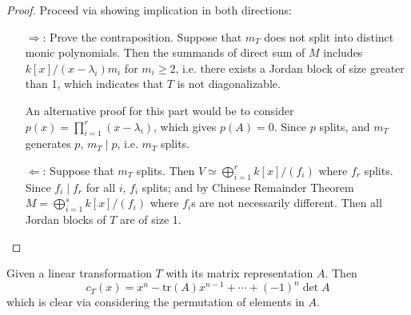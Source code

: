 \begin{proof}
    Proceed via showing implication in both directions:
    \begin{itemize}
        \item[$\Rightarrow$:] Prove the contraposition. Suppose that $m_T$ does not split into distinct monic polynomials. Then the summands of direct sum of $M$ includes $k[x]/(x - \lambda_i) m_i$ for $m_i \geq 2$, i.e. there exists a Jordan block of size greater than 1, which indicates that $T$ is not diagonalizable.

        An alternative proof for this part would be to consider $p(x) = \prod_{i=1}^r (x - \lambda_i)$, which gives $p(A) = 0$. Since $p$ splits, and $m_T$ generates $p$, $m_T\mid p$, i.e. $m_T$ splits.
        \item[$\Leftarrow$:] Suppose that $m_T$ splits. Then $V \simeq \bigoplus_{i=1}^r k[x]/(f_i)$ where $f_r$ splits. Since $f_i \mid f_r$ for all $i$, $f_i$ splits; and by Chinese Remainder Theorem $M = \bigoplus_{i=1}^s k[x]/(f_i)$ where $f_i$s are not necessarily different. Then all Jordan blocks of $T$ are of size 1.
    \end{itemize}
\end{proof}

\begin{remark}
    Given a linear transformation $T$ with its matrix representation $A$. Then 
    \[
        c_T(x) = x^n - \mathrm{tr}(A) x^{n-1} + \cdots + (-1)^n \det A
    \]
    which is clear via considering the permutation of elements in $A$. 
\end{remark}